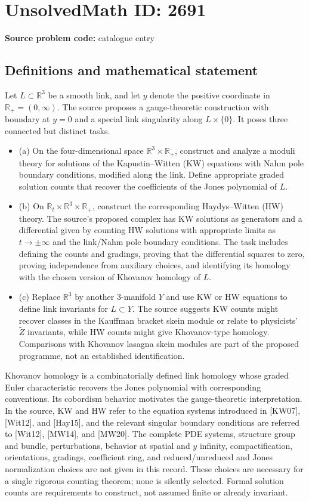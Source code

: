 \documentclass[11pt]{article}
\newcommand{\R}{\mathbb{R}}
\begin{document}
\section*{UnsolvedMath ID: 2691}
\textbf{Source problem code:} catalogue entry
\subsection{Definitions and mathematical statement}
Let $L\subset\R^3$ be a smooth link, and let $y$ denote the positive coordinate in $\R_+=(0,\infty)$. The source proposes a gauge-theoretic construction with boundary at $y=0$ and a special link singularity along $L\times\{0\}$. It poses three connected but distinct tasks.
\begin{itemize}
\item (a) On the four-dimensional space $\R^3\times\R_+$, construct and analyze a moduli theory for solutions of the Kapustin--Witten (KW) equations with Nahm pole boundary conditions, modified along the link. Define appropriate graded solution counts that recover the coefficients of the Jones polynomial of $L$.
\item (b) On $\R_t\times\R^3\times\R_+$, construct the corresponding Haydys--Witten (HW) theory. The source's proposed complex has KW solutions as generators and a differential given by counting HW solutions with appropriate limits as $t\to\pm\infty$ and the link/Nahm pole boundary conditions. The task includes defining the counts and gradings, proving that the differential squares to zero, proving independence from auxiliary choices, and identifying its homology with the chosen version of Khovanov homology of $L$.
\item (c) Replace $\R^3$ by another $3$-manifold $Y$ and use KW or HW equations to define link invariants for $L\subset Y$. The source suggests KW counts might recover classes in the Kauffman bracket skein module or relate to physicists' $\widetilde Z$ invariants, while HW counts might give Khovanov-type homology. Comparisons with Khovanov lasagna skein modules are part of the proposed programme, not an established identification.
\end{itemize}
Khovanov homology is a combinatorially defined link homology whose graded Euler characteristic recovers the Jones polynomial with corresponding conventions. Its cobordism behavior motivates the gauge-theoretic interpretation. In the source, KW and HW refer to the equation systems introduced in [KW07], [Wit12], and [Hay15], and the relevant singular boundary conditions are referred to [Wit12], [MW14], and [MW20]. The complete PDE systems, structure group and bundle, perturbations, behavior at spatial and $y$ infinity, compactification, orientations, gradings, coefficient ring, and reduced/unreduced and Jones normalization choices are not given in this record. These choices are necessary for a single rigorous counting theorem; none is silently selected. Formal solution counts are requirements to construct, not assumed finite or already invariant.
\end{document}
